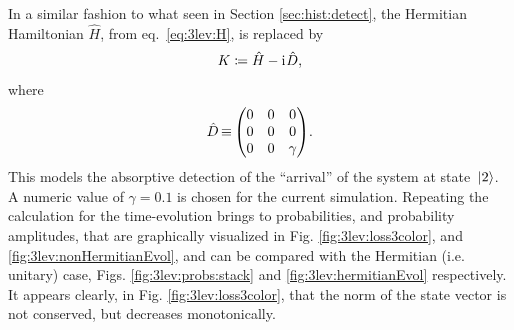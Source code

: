 In a similar fashion to what seen in Section \ref{sec:hist:detect},
the Hermitian Hamiltonian $\hat{H}$, from eq.~\eqref{eq:3lev:H},
is replaced by
\begin{equation}\label{eq:3lev:nonUnitaryH}
  K \coloneqq \hat{H} - \mathrm{i}\mkern1mu \hat{D} \text{,}
\end{equation}
where
\begin{equation}\label{eq:3lev:nonUnitaryH:antiHermitianTerm}
  \hat{D} \repr \mqty(
    0 &0 &0 \\
    0 &0 &0 \\
    0 &0 &\gamma
  ) \text{.}
\end{equation}
This models the absorptive detection of the ``arrival'' of the system at state~$\ket{2}$.
A numeric value of $\gamma = \mathtt{0.1}$ is chosen for the current simulation.
Repeating the calculation for the time-evolution
brings to
probabilities, and probability amplitudes,
that are graphically visualized in Fig. \ref{fig:3lev:loss3color}, and \ref{fig:3lev:nonHermitianEvol},
and can be compared with the Hermitian (i.e. unitary) case,
Figs. \ref{fig:3lev:probs:stack} and \ref{fig:3lev:hermitianEvol} respectively.
It appears clearly, in Fig. \ref{fig:3lev:loss3color},
that the norm of the state vector is not
conserved, but decreases monotonically. 
%
